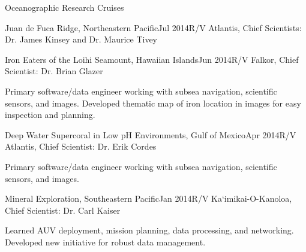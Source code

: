 \documentclass{resume} %
\begin{document}
\begin{rSection}{Oceanographic Research Cruises}
\begin{rSubsection}{Juan de Fuca Ridge, Northeastern Pacific}{Jul 2014}{R/V Atlantis, Chief Scientists: Dr. James Kinsey and Dr. Maurice Tivey}{}
\end{rSubsection}
\begin{rSubsection}{Iron Eaters of the Loihi Seamount, Hawaiian Islands}{Jun 2014}{R/V Falkor, Chief Scientist: Dr. Brian Glazer}{}
\item{Primary software/data engineer working with subsea navigation, scientific sensors, and images. Developed thematic map of iron location in images for easy inspection and planning. }
\end{rSubsection}
\begin{rSubsection}{Deep Water Supercoral in Low pH Environments, Gulf of Mexico}{Apr 2014}{R/V Atlantis, Chief Scientist: Dr. Erik Cordes}{}
\item{Primary software/data engineer working with subsea navigation, scientific sensors, and images.}
\end{rSubsection}
\begin{rSubsection}{Mineral Exploration, Southeastern Pacific}{Jan 2014}{R/V Ka`imikai-O-Kanoloa, Chief Scientist: Dr. Carl Kaiser}{}
\item{Learned AUV deployment, mission planning, data processing, and networking. Developed new initiative for robust data management.}
\end{rSubsection}
\end{rSection}




%
%
%
%
%
%
\end{document}
